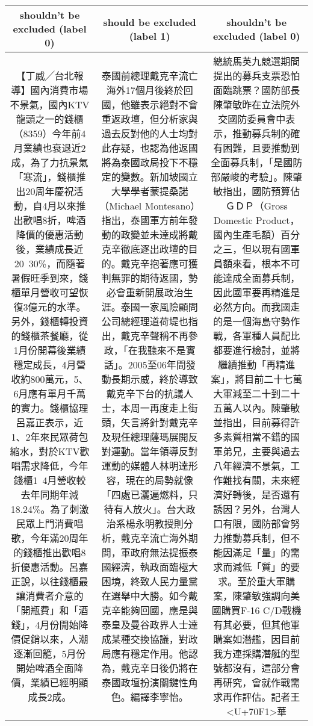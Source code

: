 {\begin{tabularx}{\textwidth}{c c c}
\textbf{shouldn't be excluded (label 0)} & 
\textbf{should be excluded (label 1)} &
\textbf{shouldn't be excluded (label 0)}\\
\hline
【丁威╱台北報導】國內消費市場不景氣，國內KTV龍頭之一的錢櫃（8359）今年前4月業績也衰退近2成，為了力抗景氣「寒流」，錢櫃推出20周年慶祝活動，自4月以來推出歡唱8折，啤酒降價的優惠活動後，業績成長近20~30\%，而隨著暑假旺季到來，錢櫃單月營收可望恢復3億元的水準。另外，錢櫃轉投資的錢櫃茶餐廳，從1月份開幕後業績穩定成長，4月營收約800萬元，5、6月應有單月千萬的實力。錢櫃協理呂嘉正表示，近1、2年來民眾荷包縮水，對於KTV歡唱需求降低，今年錢櫃1~4月營收較去年同期年減18.24\%。為了刺激民眾上門消費唱歌，今年滿20周年的錢櫃推出歡唱8折優惠活動。呂嘉正說，以往錢櫃最讓消費者介意的「開瓶費」和「酒錢」，4月份開始降價促銷以來，人潮逐漸回籠，5月份開始啤酒全面降價，業績已經明顯成長2成。
&
泰國前總理戴克辛流亡海外17個月後終於回國，他雖表示絕對不會重返政壇，但分析家與過去反對他的人士均對此存疑，也認為他返國將為泰國政局投下不穩定的變數。新加坡國立大學學者蒙提桑諾（Michael Montesano）指出，泰國軍方前年發動的政變並未達成將戴克辛徹底逐出政壇的目的。戴克辛抱著應可獲判無罪的期待返國，勢必會重新開展政治生涯。泰國一家風險顧問公司總經理道荷堤也指出，戴克辛聲稱不再參政，「在我聽來不是實話」。2005至06年間發動長期示威，終於導致戴克辛下台的抗議人士，本周一再度走上街頭，矢言將針對戴克辛及現任總理薩瑪展開反對運動。當年領導反對運動的媒體人林明達形容，現在的局勢就像「四處已灑遍燃料，只待有人放火」。台大政治系楊永明教授則分析，戴克辛流亡海外期間，軍政府無法提振泰國經濟，執政面臨極大困境，終致人民力量黨在選舉中大勝。如今戴克辛能夠回國，應是與泰皇及曼谷政界人士達成某種交換協議，對政局應有穩定作用。他認為，戴克辛日後仍將在泰國政壇扮演關鍵性角色。編譯李寧怡。
&
總統馬英九競選期間提出的募兵支票恐怕面臨跳票？國防部長陳肇敏昨在立法院外交國防委員會中表示，推動募兵制的確有困難，且要推動到全面募兵制，「是國防部嚴峻的考驗」。陳肇敏指出，國防預算佔ＧＤＰ（Gross Domestic Product，國內生產毛額）百分之三，但以現有國軍員額來看，根本不可能達成全面募兵制，因此國軍要再精進是必然方向。而我國走的是一個海島守勢作戰，各軍種人員配比都要進行檢討，並將繼續推動「再精進案」，將目前二十七萬大軍減至二十到二十五萬人以內。陳肇敏並指出，目前募得許多素質相當不錯的國軍弟兄，主要與過去八年經濟不景氣，工作難找有關，未來經濟好轉後，是否還有誘因？另外，台灣人口有限，國防部會努力推動募兵制，但不能因滿足「量」的需求而減低「質」的要求。至於重大軍購案，陳肇敏強調向美國購買F-16 C/D戰機有其必要，但其他軍購案如潛艦，因目前我方連採購潛艇的型號都沒有，這部分會再研究，會就作戰需求再作評估。記者王<U+70F1>華
\\
\hline

\end{tabularx}
}




